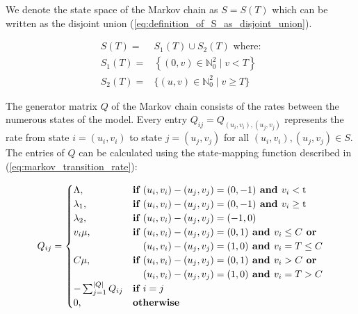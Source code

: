 We denote the state space of the Markov chain as  \(S=S(T)\) which can be 
written as the disjoint union (\ref{eq:definition_of_S_as_disjoint_union}).

\begin{align}
    S(T) =& S_1(T) \cup S_2(T) \text{ where:} \nonumber \\
    S_1(T) =& \left\{(0, v)\in\mathbb{N}_0^2 \; | \; v < T \right\} 
    \label{eq:definition_of_S_as_disjoint_union} \\
    S_2(T) =& \{(u, v)\in\mathbb{N}_0^2 \; | \; v \geq T \} \nonumber
\end{align}

The generator matrix \(Q\) of the Markov chain consists of the 
rates between the numerous states of the model. 
Every entry \( Q_{ij} = Q_{(u_i, v_i),(u_j, v_j)} \) represents the rate from 
state \( i = (u_i, v_i) \) to state \( j = (u_j , v_j) \) for all 
\( (u_i, v_i), (u_j, v_j) \in S \).
The entries of \(Q\) can be calculated using the state-mapping function 
described in (\ref{eq:markov_transition_rate}): 

\begin{equation} \label{eq:markov_transition_rate}
    Q_{ij} = 
    \begin{cases}
        \Lambda, & \textbf{if } (u_i, v_i) - (u_j, v_j) = (0,-1) \textbf{ and } 
        v_i < \text{t} \\
        \lambda_1, & \textbf{if } (u_i, v_i) - (u_j, v_j) = (0,-1) 
        \textbf{ and } v_i \geq \text{t} \\
        \lambda_2, & \textbf{if } (u_i, v_i) - (u_j, v_j) = (-1,0) \\
        v_i \mu, & \textbf{if } (u_i, v_i) - (u_j, v_j) = (0,1) \textbf{ and } 
        v_i \leq C \textbf{ or} \\ & \hspace{0.37cm}(u_i, v_i) - (u_j, v_j) = 
        (1,0) \textbf{ and } v_i = T \leq C \\
        C \mu, & \textbf{if } (u_i, v_i) - (u_j, v_j) = (0,1) \textbf{ and } 
        v_i > C 
        \textbf{ or} \\ & \hspace{0.37cm}(u_i, v_i) - (u_j, v_j) = (1,0) 
        \textbf{ and } v_i = T > C\\
        -\sum_{j=1}^{|Q|}{Q_{ij}} & \textbf{if } i = j \\
        0, & \textbf{otherwise}
    \end{cases}
\end{equation}

